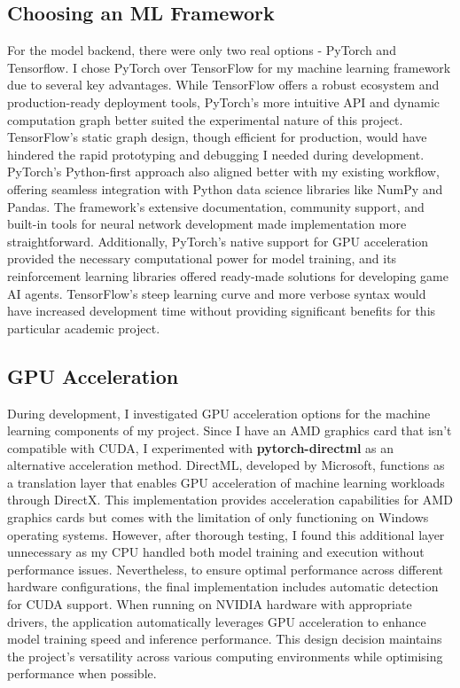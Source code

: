 \subsection{Choosing an ML Framework}

For the model backend, there were only two real options - PyTorch and Tensorflow.
I chose PyTorch over TensorFlow for my machine learning framework due to several key advantages. 
While TensorFlow offers a robust ecosystem and production-ready deployment tools, PyTorch's more intuitive API and dynamic computation graph better suited the experimental nature of this project. 
TensorFlow's static graph design, though efficient for production, would have hindered the rapid prototyping and debugging I needed during development. 
PyTorch's Python-first approach also aligned better with my existing workflow, offering seamless integration with Python data science libraries like NumPy and Pandas. 
The framework's extensive documentation, community support, and built-in tools for neural network development made implementation more straightforward. 
Additionally, PyTorch's native support for GPU acceleration provided the necessary computational power for model training, and its reinforcement learning libraries offered ready-made solutions for developing game AI agents. 
TensorFlow's steep learning curve and more verbose syntax would have increased development time without providing significant benefits for this particular academic project.

\subsection{GPU Acceleration}

During development, I investigated GPU acceleration options for the machine learning components of my project. 
Since I have an AMD graphics card that isn't compatible with CUDA, I experimented with \textbf{pytorch-directml} as an alternative acceleration method. 
DirectML, developed by Microsoft, functions as a translation layer that enables GPU acceleration of machine learning workloads through DirectX. 
This implementation provides acceleration capabilities for AMD graphics cards but comes with the limitation of only functioning on Windows operating systems.
However, after thorough testing, I found this additional layer unnecessary as my CPU handled both model training and execution without performance issues.
Nevertheless, to ensure optimal performance across different hardware configurations, the final implementation includes automatic detection for CUDA support. 
When running on NVIDIA hardware with appropriate drivers, the application automatically leverages GPU acceleration to enhance model training speed and inference performance. 
This design decision maintains the project's versatility across various computing environments while optimising performance when possible.

